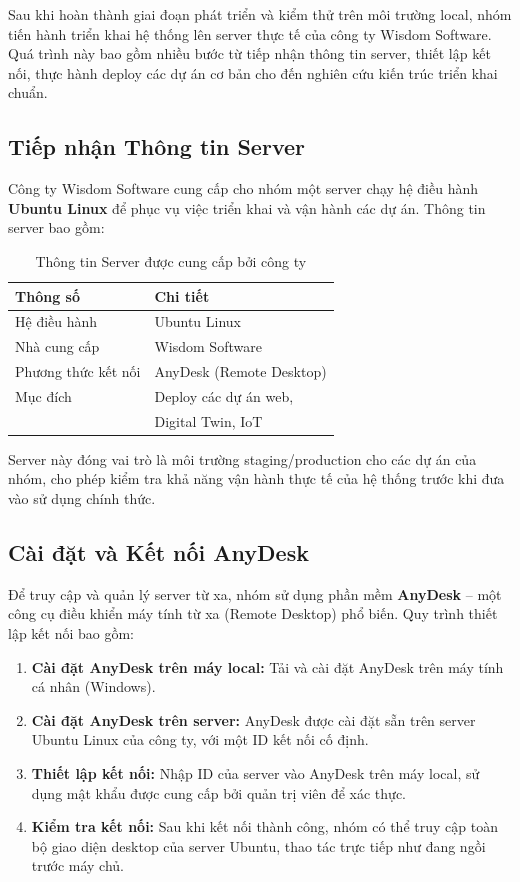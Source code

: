 \documentclass[twocolumn]{article}
\begin{document}
Sau khi hoàn thành giai đoạn phát triển và kiểm thử trên môi trường local, nhóm tiến hành triển khai hệ thống lên server thực tế của công ty Wisdom Software. Quá trình này bao gồm nhiều bước từ tiếp nhận thông tin server, thiết lập kết nối, thực hành deploy các dự án cơ bản cho đến nghiên cứu kiến trúc triển khai chuẩn.

\subsection{Tiếp nhận Thông tin Server}
Công ty Wisdom Software cung cấp cho nhóm một server chạy hệ điều hành \textbf{Ubuntu Linux} để phục vụ việc triển khai và vận hành các dự án. Thông tin server bao gồm:

\begin{table}[h!]
\centering
\small
\begin{tabular}{|l|l|}
\hline
\textbf{Thông số} & \textbf{Chi tiết} \\
\hline
Hệ điều hành & Ubuntu Linux \\
\hline
Nhà cung cấp & Wisdom Software \\
\hline
Phương thức kết nối & AnyDesk (Remote Desktop) \\
\hline
Mục đích & Deploy các dự án web, \\
 & Digital Twin, IoT \\
\hline
\end{tabular}
\caption{Thông tin Server được cung cấp bởi công ty}
\label{tab:server_info}
\end{table}

Server này đóng vai trò là môi trường staging/production cho các dự án của nhóm, cho phép kiểm tra khả năng vận hành thực tế của hệ thống trước khi đưa vào sử dụng chính thức.

\subsection{Cài đặt và Kết nối AnyDesk}
Để truy cập và quản lý server từ xa, nhóm sử dụng phần mềm \textbf{AnyDesk} -- một công cụ điều khiển máy tính từ xa (Remote Desktop) phổ biến. Quy trình thiết lập kết nối bao gồm:

\begin{enumerate}[noitemsep]
	\item \textbf{Cài đặt AnyDesk trên máy local:} Tải và cài đặt AnyDesk trên máy tính cá nhân (Windows).
	\item \textbf{Cài đặt AnyDesk trên server:} AnyDesk được cài đặt sẵn trên server Ubuntu Linux của công ty, với một ID kết nối cố định.
	\item \textbf{Thiết lập kết nối:} Nhập ID của server vào AnyDesk trên máy local, sử dụng mật khẩu được cung cấp bởi quản trị viên để xác thực.
	\item \textbf{Kiểm tra kết nối:} Sau khi kết nối thành công, nhóm có thể truy cập toàn bộ giao diện desktop của server Ubuntu, thao tác trực tiếp như đang ngồi trước máy chủ.
\end{enumerate}
\end{document}
